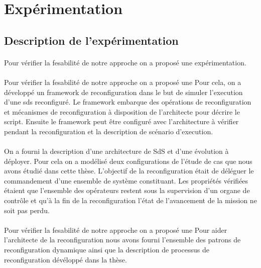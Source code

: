 \section{Expérimentation}

\subsection{Description de l'expérimentation}

\paragraph{}
Pour vérifier la fesabilité de notre approche on a proposé une
expérimentation. 

\paragraph{}
Pour vérifier la fesabilité de notre approche on a proposé une
Pour cela, on a développé un framework de
reconfiguration dans le but de simuler l'execution d'une sds
reconfiguré. Le framework embarque des opérations de reconfiguration
et mécanismes de reconfiguration à disposition de l'architecte pour
décrire le script. 
Ensuite le framework peut être configuré avec l'architecture à
vérifier pendant la reconfiguration et la description de scénario
d'execution. 

\paragraph{}
On a fourni la description d'une architecture de SdS
et d'une évolution à déployer. Pour cela on a modélisé deux
configurations de l'étude de cas que nous avons étudié dans cette
thèse. L'objectif de la reconfiguration était de déléguer le
commandement d'une ensemble de système constituant. Les propriétés
vérifiées étaient que l'ensemble des opérateurs restent sous la
supervision d'un organe de contrôle et qu'à la fin de la
reconfiguration l'état de l'avancement de la mission ne soit pas
perdu. 

\paragraph{}
Pour vérifier la fesabilité de notre approche on a proposé une
Pour aider l'architecte de la reconfiguration nous avons fourni
l'ensemble des patrons de reconfiguration dynamique ainsi que la
description de processus de reconfiguration dévéloppé dans la thèse. 

